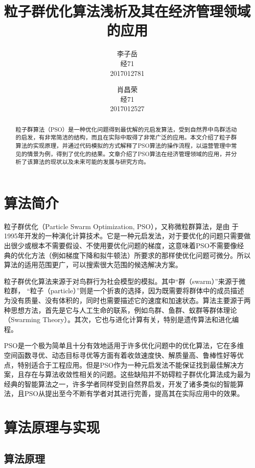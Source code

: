 \documentclass[lang=cn,12pt,a4paper,cite=authoryear]{elegantpaper}
\title{粒子群优化算法浅析及其在经济管理领域的应用}
\author{李子岳 \\ 经71 \\ 2017012781 \and 肖昌荣 \\ 经71 \\ 2017012527}
\date{\zhtoday}
\begin{document}
\maketitle

\begin{abstract}
粒子群算法（PSO）是一种优化问题得到最优解的元启发算法，受到自然界中鸟群活动的启发，有非常简洁的结构，而且在实际中取得了非常广泛的应用。本文介绍了粒子群算法的实现原理，并通过代码模拟的方式解释了PSO算法的操作流程，以运营管理中常见的情景为例，得到了优化的结果。文章介绍了PSO算法在经济管理领域的应用，并分析了该算法的现状以及未来可能的发展与研究方向。
\end{abstract}

\section{算法简介}

粒子群优化（Particle Swarm Optimization, PSO），又称微粒群算法，是由 \cite{kennedy1995particle}于1995年开发的一种演化计算技术。它是一种元启发法，对于要优化的问题只需要做出很少或根本不需要假设、不使用要优化问题的梯度，这意味着PSO不需要像经典的优化方法（例如梯度下降和拟牛顿法）所要求的那样使优化问题可微分。所以算法的适用范围更广，可以搜索很大范围的候选解决方案。

粒子群优化算法来源于对鸟群行为社会模型的模拟。其中“群（swarm）”来源于微粒群， “粒子（particle）”则是一个折衷的选择，因为既需要将群体中的成员描述为没有质量、没有体积的，同时也需要描述它的速度和加速状态。算法主要源于两种思想方法，首先是它与人工生命的联系，例如鸟群、鱼群、蚁群等群体理论（Swarming Theory）。其次，它也与进化计算有关，特别是遗传算法和进化编程\citep{kennedy1995particle}。

PSO是一个极为简单且十分有效地适用于许多优化问题中的优化算法，它在多维空间函数寻优、动态目标寻优等方面有着收敛速度快、解质量高、鲁棒性好等优点，特别适合于工程应用\citep{huanglei}。但是PSO作为一种元启发法不能保证找到最佳解决方案，且存在与算法收敛性相关的问题。这些缺陷并不妨碍粒子群优化算法成为最为经典的智能算法之一，许多学者同样受到自然界启发，开发了诸多类似的智能算法，且PSO从提出至今不断有学者对其进行完善，提高其在实际应用中的效果。


\section{算法原理与实现}

\subsection{算法原理}
\end{document}
